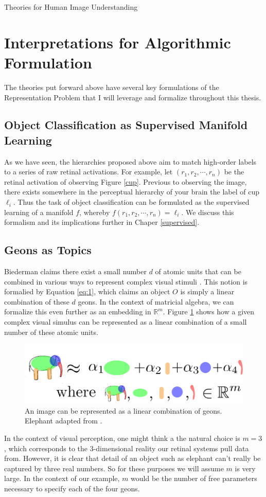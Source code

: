 \documentclass[12pt]{pom_thesis}
\begin{document}
\begin{chapter}{Theories for Human Image Understanding}
\section{Interpretations for Algorithmic Formulation}
\label{interp}
The theories put forward above have several key formulations of the Representation Problem that I will leverage and formalize throughout this thesis. 

\subsection*{Object Classification as Supervised Manifold Learning}
\label{manifold}

As we have seen, the hierarchies proposed above aim to match high-order labels to a series of raw retinal activations. For example, let $(r_1,r_2,\cdots, r_n)$ be the retinal activation of observing Figure \ref{cup}. Previous to observing the image, there exists somewhere in the perceptual hierarchy of your brain the label of cup $\ell_i$. Thus the task of object classification  can be formulated as the supervised learning of a manifold $f$, whereby $f(r_1,r_2,\cdots,r_n) = \ell_i$. We discuss this formalism and its implications further in Chaper \ref{supervised}.

\subsection*{Geons as Topics}
Biederman claims there exist a small number $d$ of atomic units that can be combined in various ways to represent complex visual stimuli \cite{biederman1987recognition}. This notion is formalied by Equation \ref{eq:1}, which claims an object $O$ is simply a linear combination of these $d$ geons. In the context of matricial algebra, we can formalize this even further as an embedding in $\mathbb{R}^m$. Figure \ref{fig:geonLC} shows how a given complex visual simulus can be represented as a linear combination of  a small number of these atomic units. 


\begin{figure}[h]
	\label{fig:geonLC}
	\centering
	\includegraphics[width=15cm]{geonLC}
	\caption{An image can be represented as a linear combination of geons. Elephant adapted from \cite{biederman1987recognition}.}
\end{figure}
 In the context of visual perception, one might think a the natural choice is $m=3$, which corresponds to the 3-dimensional reality our retinal systems pull data from. However, it is clear that detail of an object such as elephant can't really be captured by three real numbers. So for these purposes we will assume $m$ is very large.  In the context of our example, $m$ would be the number of free parameters necessary to specify each of the four geons.  



\end{chapter}
\end{document}
